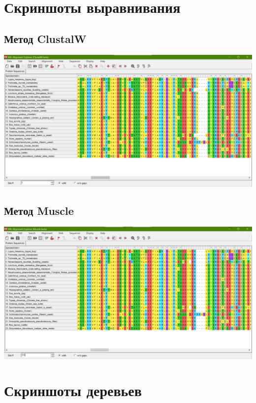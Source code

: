 \documentclass{article}
\begin{document}
  \section{Скриншоты выравнивания}
  \subsection{Метод ClustalW}
  \includegraphics[width=\textwidth]{ClustalW.png}
  \subsection{Метод Muscle}
  \includegraphics[width=\textwidth]{Muscle.png}

  \section{Скриншоты деревьев}
\end{document}
